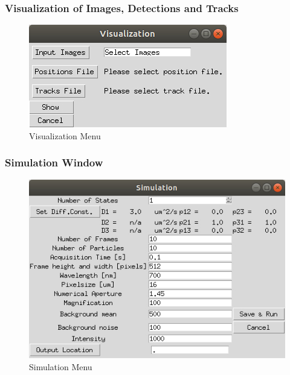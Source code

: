 \documentclass[oneside,letterpaper]{scrartcl}
\def\myscale{0.55}
\begin{document}
\subsubsection{Visualization of Images, Detections and Tracks}
\begin{figure}
\centering
\includegraphics[scale=\myscale]{Figures/VisualizationGUI.jpg}
\caption{Visualization Menu}
\end{figure}
\blindtext

\subsubsection{Simulation Window}
\begin{figure}
\centering
\includegraphics[scale=\myscale]{Figures/SimulationGUI.jpg}
\caption{Simulation Menu}
\end{figure}
\blindtext
\end{document}
